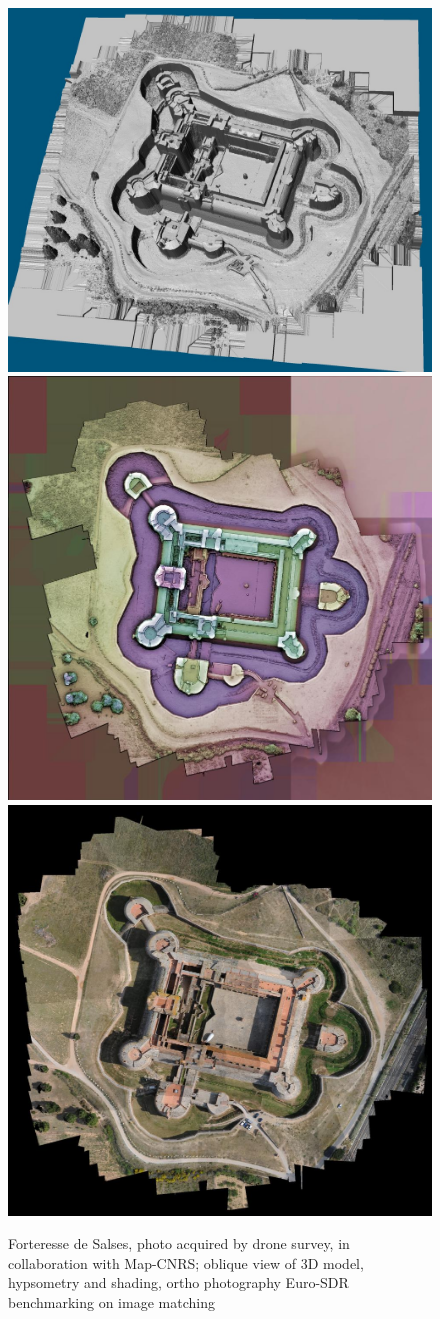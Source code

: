 \begin{figure}
\includegraphics[width=90 mm]{FIGS/SAMPLES/SlsMNE_1_25.jpg}
\includegraphics[width=90 mm]{FIGS/SAMPLES/Salse2.jpg}
\includegraphics[width=90 mm]{FIGS/SAMPLES/Ortho-Test-Redr.jpg}
\caption{Forteresse de Salses, photo acquired by drone survey, in collaboration
with Map-CNRS; oblique view of 3D model, hypsometry and shading, ortho photography
Euro-SDR benchmarking on image matching}
\end{figure}



